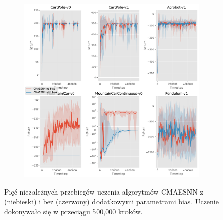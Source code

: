\documentclass[12pt,a4paper]{article}
\begin{document}
\begin{figure}[ht!]
  \begin{subfigure}[ht!]{0.35\textwidth}
    \includegraphics[width=\textwidth]{../plotting/plots/plot_bias_perf4.pdf}
    \caption{}
  \end{subfigure}
  \caption{Pięć niezależnych przebiegów uczenia algorytmów CMAESNN
    z (niebieski) i bez (czerwony) dodatkowymi parametrami bias.
    Uczenie dokonywało się w przeciągu 500,000 kroków.}
  \label{}

\end{figure}
\end{document}
